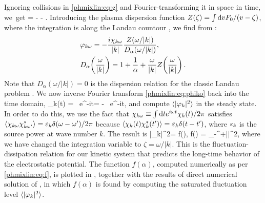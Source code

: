 Ignoring collisions in \eqref{phmixlin:eq:g} and Fourier-transforming it in space in time, 
we~get 
\beq
\gko = - \phiko{} - .
\label{phmixlin:eq:gko}
\eeq
Introducing the plasma dispersion function $Z(\zeta) = \int{\rm d} v F_0/(v-\zeta)$, 
where the integration is along the Landau countour \cite{fried61}, we find from 
:
\begin{align}
\label{phmixlin:eq:phiko}
&\varphi_{k\omega} = - \frac{i\chi_{k\omega}}{|k|}\frac{Z(\omega/|k|)}{D_\alpha(\omega/|k|)},\\
&D_\alpha\!\left(\frac{\omega}{|k|}\right) = 1 + \frac{1}{\alpha} + \frac{\omega}{|k|} Z\!\left(\frac{\omega}{|k|}\right).
\end{align}
Note that $D_\alpha(\omega/|k|) = 0$ is the dispersion relation for the classic Landau problem \cite{landau46}. 
We now inverse Fourier transform \eqref{phmixlin:eq:phiko} back into the time domain, 
\beq
\phi_k(t) = \int\rmd\omega\, e^{-i\omega t}\phiko = 
 - \int\rmd\omega\, e^{-i\omega t}\chiko{},
\eeq
and compute $\langle|\varphi_k|^2\rangle$ 
in the steady state. In order to do this, we use the fact that 
$\chi_{k\omega} \equiv \int{\rm d} t e^{i\omega t}\chi_k(t)/2\pi$ satisfies 
$\langle\chi_{k\omega}\chi^*_{k\omega'}\rangle = \varepsilon_k\delta(\omega-\omega')/2\pi$
because $\langle\chi_k(t)\chi_k^*(t')\rangle = \varepsilon_k\delta(t-t')$, where 
$\varepsilon_k$ is the source power at wave number $k$. 
The result is
\beq
\la|\phi_k|^2\ra = f(\alpha),\quad 
f(\alpha) = \int_{-\infty}^{+\infty}\rmd\zeta\lt|\rt|^2,
\label{phmixlin:eq:f}
\eeq
where we have changed the integration variable to $\zeta=\omega/|k|$. 
This is the fluctuation-dissipation relation for our kinetic system that predicts the
long-time behavior of the electrostatic potential. 
The function $f(\alpha)$, computed numerically as per \eqref{phmixlin:eq:f}, 
is plotted in , together with the results of 
direct numerical solution of , in which $f(\alpha)$ 
is found by computing the saturated fluctuation level $\langle|\varphi_k|^2\rangle$. 

